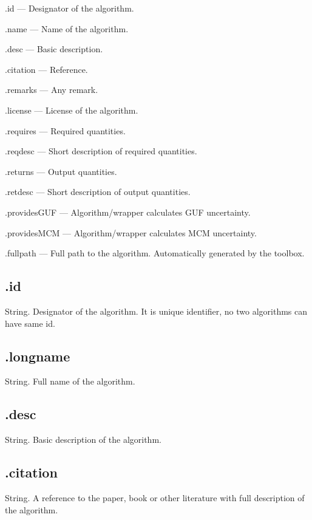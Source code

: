 \documentclass[12pt,a4paper,oneside]{report} %
\begin{document}
\begin{tightdesc}
        \item [\textsf{.id}] --- Designator of the algorithm.
        \item [\textsf{.name}] ---  Name of the algorithm.
        \item [\textsf{.desc}] ---  Basic description.
        \item [\textsf{.citation}] ---  Reference.
        \item [\textsf{.remarks}] ---  Any remark.
        \item [\textsf{.license}] ---  License of the algorithm.
        \item [\textsf{.requires}] ---  Required quantities.
        \item [\textsf{.reqdesc}] ---  Short description of required quantities.
        \item [\textsf{.returns}] ---  Output quantities.
        \item [\textsf{.retdesc}] ---  Short description of output quantities.
        \item [\textsf{.providesGUF}] ---  Algorithm/wrapper calculates GUF uncertainty.
        \item [\textsf{.providesMCM}] ---  Algorithm/wrapper calculates MCM uncertainty.
        \item [\textsf{.fullpath}] ---  Full path to the algorithm. Automatically generated by the toolbox.
\end{tightdesc}

\subsection{\textsf{.id}} %
String. Designator of the algorithm. It is unique identifier, no two algorithms can have same id.

\subsection{\textsf{.longname}} %
String. Full name of the algorithm. 

\subsection{\textsf{.desc}} %
String. Basic description of the algorithm.

\subsection{\textsf{.citation}} %
String. A reference to the paper, book or other literature with full description of the algorithm.
\end{document}
